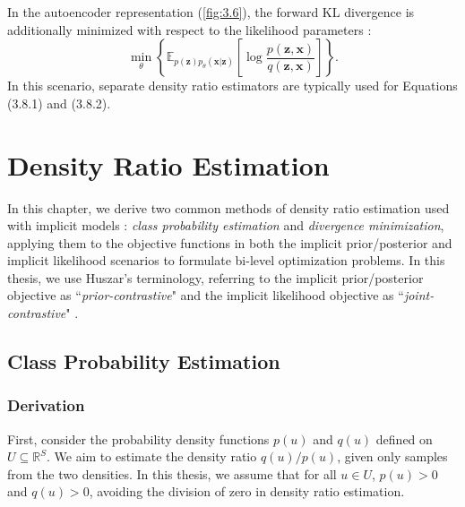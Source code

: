 \documentclass[honours,12pt, twoside]{unswthesis}
\newcommand{\R}{\mathbb{R}}
\numberwithin{equation}{section}
\theoremstyle{definition}
\begin{document}
In the autoencoder representation (\autoref{fig:3.6}), the forward KL divergence is additionally minimized with respect to the likelihood parameters \citep{tiao}:
\begin{equation}
\min_\theta \left\lbrace\mathbb{E}_{p(\bm{z})p_\theta(\bm{x}|\bm{z})}\left[\log \frac{p(\bm{z},\bm{x})}{q(\bm{z},\bm{x})}\right]\right\rbrace.
\end{equation}
In this scenario, separate density ratio estimators are typically used for Equations (3.8.1) and (3.8.2).
\chapter{Density Ratio Estimation}\label{ch4}
In this chapter, we derive two common methods of density ratio estimation used with implicit models \citep{sugiyama, mohamed}: \textit{class probability estimation} and \textit{divergence minimization}, applying them to the objective functions in both the implicit prior/posterior and implicit likelihood scenarios to formulate bi-level optimization problems. In this thesis, we use Huszar's terminology, referring to the implicit prior/posterior objective as ``\textit{prior-contrastive}" and the implicit likelihood objective as ``\textit{joint-contrastive}" \citep{huszar}.
\section{Class Probability Estimation}\label{sec:4.1}
\subsection{Derivation}\label{sec:4.1.1}
First, consider the probability density functions $p(u)$ and $q(u)$ defined on $U\subseteq \R^S$. We aim to estimate the density ratio $q(u)/p(u)$, given only samples from the two densities. In this thesis, we assume that for all $u\in U$, $p(u)>0$ and $q(u)>0$, avoiding the division of zero in density ratio estimation.
\end{document}
